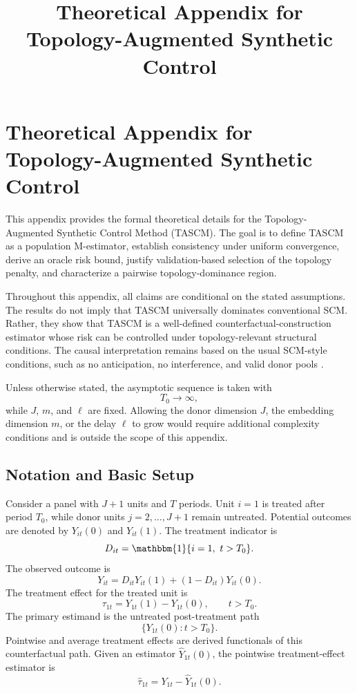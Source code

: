 \documentclass[11pt]{article}
\title{Theoretical Appendix for Topology-Augmented Synthetic Control}
\author{}
\date{}
\theoremstyle{plain}
\theoremstyle{definition}
\theoremstyle{remark}
\newcommand{\1}{\mathbbm{1}}
\begin{document}
\maketitle

\appendix

\section{Theoretical Appendix for Topology-Augmented Synthetic Control}

This appendix provides the formal theoretical details for the
Topology-Augmented Synthetic Control Method (TASCM). The goal is to define
TASCM as a population M-estimator, establish consistency under uniform
convergence, derive an oracle risk bound, justify validation-based selection of
the topology penalty, and characterize a pairwise topology-dominance region.

Throughout this appendix, all claims are conditional on the stated assumptions.
The results do not imply that TASCM universally dominates conventional SCM.
Rather, they show that TASCM is a well-defined counterfactual-construction
estimator whose risk can be controlled under topology-relevant structural
conditions. The causal interpretation remains based on the usual SCM-style
conditions, such as no anticipation, no interference, and valid donor pools
\citep{abadie2010synthetic,abadie2021using}.

Unless otherwise stated, the asymptotic sequence is taken with
\[
T_0\to\infty,
\]
while \(J\), \(m\), and \(\ell\) are fixed. Allowing the donor dimension \(J\),
the embedding dimension \(m\), or the delay \(\ell\) to grow would require
additional complexity conditions and is outside the scope of this appendix.

\subsection{Notation and Basic Setup}

Consider a panel with \(J+1\) units and \(T\) periods. Unit \(i=1\) is treated
after period \(T_0\), while donor units \(j=2,\ldots,J+1\) remain untreated.
Potential outcomes are denoted by \(Y_{it}(0)\) and \(Y_{it}(1)\). The treatment
indicator is
\[
D_{it}
=
\1\{i=1,\ t>T_0\}.
\]
The observed outcome is
\[
Y_{it}
=
D_{it}Y_{it}(1)
+
(1-D_{it})Y_{it}(0).
\]
The treatment effect for the treated unit is
\[
\tau_{1t}
=
Y_{1t}(1)-Y_{1t}(0),
\qquad t>T_0.
\]
The primary estimand is the untreated post-treatment path
\[
\{Y_{1t}(0):t>T_0\}.
\]
Pointwise and average treatment effects are derived functionals of this
counterfactual path. Given an estimator \(\widehat Y_{1t}(0)\), the pointwise
treatment-effect estimator is
\[
\widehat \tau_{1t}
=
Y_{1t}-\widehat Y_{1t}(0).
\]
\end{document}
